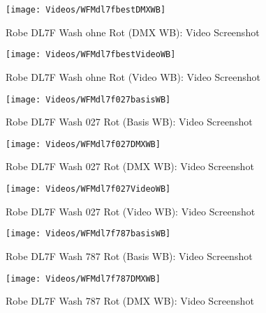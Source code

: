 \documentclass[pagesize,paper=A4,fontsize=12pt,utf8,numbers=noenddot,bibliography=totoc,listof=totoc,DIV=11,BCOR=1mm]{scrreprt}
\begin{document}
\begin{figure}[htp]     %
\centering
\texttt{[image: Videos/WFMdl7fbestDMXWB]} 
\caption {Robe DL7F Wash ohne Rot (DMX WB): Video Screenshot} 
\end{figure}

\begin{figure}[htp]     %
\centering
\texttt{[image: Videos/WFMdl7fbestVideoWB]} 
\caption {Robe DL7F Wash ohne Rot (Video WB): Video Screenshot} 
\end{figure}



\begin{figure}[htp]     %
\centering
\texttt{[image: Videos/WFMdl7f027basisWB]} 
\caption {Robe DL7F Wash 027 Rot (Basis WB): Video Screenshot} 
\end{figure}

\begin{figure}[htp]     %
\centering
\texttt{[image: Videos/WFMdl7f027DMXWB]} 
\caption {Robe DL7F Wash 027 Rot (DMX WB): Video Screenshot} 
\end{figure}

\begin{figure}[htp]     %
\centering
\texttt{[image: Videos/WFMdl7f027VideoWB]} 
\caption {Robe DL7F Wash 027 Rot (Video WB): Video Screenshot} 
\end{figure}



\begin{figure}[htp]     %
\centering
\texttt{[image: Videos/WFMdl7f787basisWB]} 
\caption {Robe DL7F Wash 787 Rot (Basis WB): Video Screenshot} 
\end{figure}

\begin{figure}[htp]     %
\centering
\texttt{[image: Videos/WFMdl7f787DMXWB]} 
\caption {Robe DL7F Wash 787 Rot (DMX WB): Video Screenshot} 
\end{figure}
\end{document}
